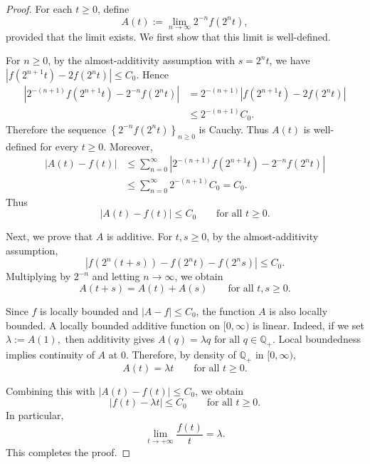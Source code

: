 \documentclass[preprint]{elsarticle}
\numberwithin{equation}{section}
\begin{document}
\begin{proof}
For each $t\ge0$, define
\begin{equation*}
A(t):=\lim_{n\to\infty}2^{-n}f(2^n t),
\end{equation*}
provided that the limit exists. We first show that this limit is well-defined.

For $n\ge0$, by the almost-additivity assumption with $s=2^n t$, we have $\left|f(2^{n+1}t)-2f(2^n t)\right|\le C_0.$
Hence
\begin{align*}
\left|
2^{-(n+1)}f(2^{n+1}t)-2^{-n}f(2^n t)
\right|
&=
2^{-(n+1)}
\left|
f(2^{n+1}t)-2f(2^n t)
\right|
\\
&\le
2^{-(n+1)}C_0.
\end{align*}
Therefore the sequence
$
\left\{2^{-n}f(2^n t)\right\}_{n\ge0}
$
is Cauchy. Thus $A(t)$ is well-defined for every $t\ge0$. Moreover,
\begin{align*}
|A(t)-f(t)|
&\le
\sum_{n=0}^{\infty}
\left|
2^{-(n+1)}f(2^{n+1}t)-2^{-n}f(2^n t)
\right|
\\
&\le
\sum_{n=0}^{\infty}2^{-(n+1)}C_0
=
C_0.
\end{align*}
Thus
\begin{equation*}
|A(t)-f(t)|\le C_0
\qquad\text{for all }t\ge0.
\end{equation*}

Next, we prove that $A$ is additive. For $t,s\ge0$, by the almost-additivity assumption,
\begin{equation*}
\left|
f(2^n(t+s))-f(2^n t)-f(2^n s)
\right|
\le C_0.
\end{equation*}
Multiplying by $2^{-n}$ and letting $n\to\infty$, we obtain
\begin{equation*}
A(t+s)=A(t)+A(s)
\qquad\text{for all }t,s\ge0.
\end{equation*}

Since $f$ is locally bounded and $|A-f|\le C_0$, the function $A$ is also locally bounded. A locally bounded additive function on $[0,\infty)$ is linear. Indeed, if we set
$
\lambda:=A(1),
$
then additivity gives
$
A(q)=\lambda q
\text{ for all }q\in\mathbb Q_+.
$
Local boundedness implies continuity of $A$ at $0$. Therefore, by density of $\mathbb Q_+$ in $[0,\infty)$,
\begin{equation*}
A(t)=\lambda t
\qquad\text{for all }t\ge0.
\end{equation*}

Combining this with $|A(t)-f(t)|\le C_0$, we obtain
\begin{equation*}
|f(t)-\lambda t|\le C_0
\qquad\text{for all }t\ge0.
\end{equation*}
In particular,
\begin{equation*}
\lim_{t\to+\infty}\frac{f(t)}{t}=\lambda.
\end{equation*}
This completes the proof.
\end{proof}
\end{document}

